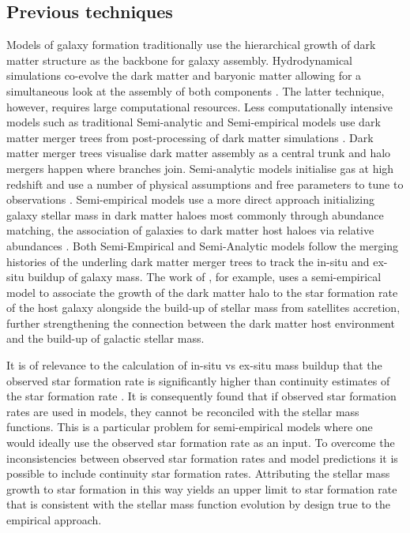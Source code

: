 \subsection{Previous techniques}

Models of galaxy formation traditionally use the hierarchical growth of dark matter structure as the backbone for galaxy assembly. Hydrodynamical simulations co-evolve the dark matter and baryonic matter allowing for a simultaneous look at the assembly of both components \citep{McAlpine2015TheCatalogues,Vogelsberger2014IntroducingUniverse}. The latter technique, however, requires large computational resources. Less computationally intensive models such as traditional Semi-analytic and Semi-empirical models use dark matter merger trees from post-processing of dark matter simulations \citep{Guo2011FromCosmology, Shankar2013}. Dark matter merger trees visualise dark matter assembly as a central trunk and halo mergers happen where branches join. Semi-analytic models initialise gas at high redshift and use a number of physical assumptions and free parameters to tune to observations \citep{DeLucia2006TheGalaxies, Guo2011FromCosmology}. Semi-empirical models use a more direct approach initializing galaxy stellar mass in dark matter haloes most commonly through abundance matching, the association of galaxies to dark matter host haloes via relative abundances \citep{Hopkins2010MERGERSMATTER, Zavala2012, Moster2013, Shankar2014, Moster2018Emerge10}. Both Semi-Empirical and Semi-Analytic models follow the merging histories of the underling dark matter merger trees to track the in-situ and ex-situ buildup of galaxy mass. The work of \citet{Moster2018Emerge10}, for example, uses a semi-empirical model to associate the growth of the dark matter halo to the star formation rate of the host galaxy alongside the build-up of stellar mass from satellites accretion, further strengthening the connection between the dark matter host environment and the build-up of galactic stellar mass.


It is of relevance to the calculation of in-situ vs ex-situ mass buildup that the observed star formation rate is significantly higher than continuity estimates of the star formation rate \citep[e.g.][]{Leja2015ReconcilingFunction, Lapi2017StellarEquation}. It is consequently found that if observed star formation rates are used in models, they cannot be reconciled with the stellar mass functions. This is a particular problem for semi-empirical models where one would ideally use the observed star formation rate as an input. To overcome the inconsistencies between observed star formation rates and model predictions it is possible to include continuity star formation rates. Attributing the stellar mass growth to star formation in this way yields an upper limit to star formation rate that is consistent with the stellar mass function evolution by design true to the empirical approach.


